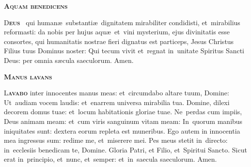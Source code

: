 \documentclass[first]{../altarcard}
\begin{document}
\begin{center}

	\fontsize{13.5}{16.2}\selectfont

	\begin{minipage}{0.55\linewidth}

		\topgap\topgap\topgap

		\begin{center}
			\scshape\bfseries\Huge 
			Aquam benedicens
		\end{center}

		\gap

		\lettrine[lines=3]{\color{newred}D}{\bfseries\color{newred}eus}
		\cross~qui human\ae~substanti\ae~dignitatem mirabiliter
		condidisti, et~mirabilius reformasti: da nobis per hujus
		aqu\ae~et~vini mysterium, ejus divinitatis esse consortes, qui
		humanitatis nostrae fieri dignatus est particeps, Jesus
		Christus Filius tuus Dominus noster: Qui tecum vivit et~regnat
		in~unitate Spiritus Sancti Deus: per omnia s\ae cula
		saeculorum. \textcolor{newred}{Amen.}

		\topgap

		\centerline{ \scshape\bfseries\Huge Manus lavans}

		\gap

		\lettrine[lines=3]{\color{newred}L}{\bfseries\color{newred}avabo}
		inter innocentes manus meas: et~circumdabo altare tuum, Domine:
		Ut~audiam vocem laudis: et~enarrem universa mirabilia tua.
		Domine, dilexi decorem domus tuae: et~locum habitationis
		gloriae tuae. Ne~perdas cum impiis, Deus animam meam: et~cum
		viris sanguinum vitam meam: In~quorum manibus iniquitates sunt:
		dextera eorum repleta est muneribus. Ego autem in innocentia
		mea ingressus sum: redime me, et~miserere mei. Pes meus stetit
		in~directo: in~ecclesiis benedicam te, Domine. Gloria Patri, et
		Filio, et~Spiritui Sancto. Sicut erat in~principio, et~nunc,
		et~semper: et~in~saecula saeculorum. \textcolor{newred}{Amen.}
	\end{minipage}

\end{center}
\end{document}
